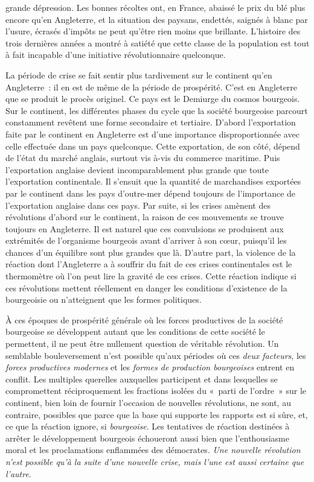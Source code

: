 \documentclass[twoside]{book} %
\begin{document}
grande dépression. Les bonnes récoltes ont, en France, abaissé le prix du blé plus encore qu’en Angleterre, et la situation des paysans, endettés, saignés à blanc par l’usure, écrasés d’impôts ne peut qu’être rien moins que brillante. L’histoire des trois dernières années a montré à satiété que cette classe de la population est tout à fait incapable d’une initiative révolutionnaire quelconque.\par
La période de crise se fait sentir plus tardivement sur le continent qu’en Angleterre : il en est de même de la période de prospérité. C’est en Angleterre que se produit le procès originel. Ce pays est le Demiurge du cosmos bourgeois. Sur le continent, les différentes phases du cycle que la société bourgeoise parcourt constamment revêtent une forme secondaire et tertiaire. D’abord l’exportation faite par le continent en Angleterre est d’une importance disproportionnée avec celle effectuée dans un pays quelconque. Cette exportation, de son côté, dépend de l’état du marché anglais, surtout vis à-vis du commerce maritime. Puis l’exportation anglaise devient incomparablement plus grande que toute l’exportation continentale. Il s’ensuit que la quantité de marchandises exportées par le continent dans les pays d’outre-mer dépend toujours de l’importance de l’exportation anglaise dans ces pays. Par suite, si les crises amènent des révolutions d’abord sur le continent, la raison de ces mouvements se trouve toujours en Angleterre. Il est naturel que ces convulsions se produisent aux extrémités de l’organisme bourgeois avant d’arriver à son cœur, puisqu’il les chances d’un équilibre sont plus grandes que là. D’autre part, la violence de la réaction dont l’Angleterre a à souffrir du fait de ces crises continentales est le thermomètre où l’on peut lire la gravité de ces crises. Cette réaction indique si ces révolutions mettent réellement en danger les conditions d’existence de la bourgeoisie ou n’atteignent que les formes politiques.\par
À ces époques de prospérité générale où les forces productives de la société bourgeoise se développent autant que les conditions de cette société le permettent, il ne peut être nullement question de véritable révolution. Un semblable bouleversement n’est possible qu’aux périodes où ces \emph{deux facteurs}, les \emph{forces productives modernes} et les \emph{formes de production bourgeoises} entrent en conflit. Les multiples querelles auxquelles participent et dans lesquelles se compromettent réciproquement les fractions isolées du « parti de l’ordre » sur le continent, bien loin de fournir l’occasion de nouvelles révolutions, ne sont, au contraire, possibles que parce que la base qui supporte les rapports est si sûre, et, ce que la réaction ignore, si \emph{bourgeoise}. Les tentatives de réaction destinées à arrêter le développement bourgeois échoueront aussi bien que l’enthousiasme moral et les proclamations enflammées des démocrates. \emph{Une nouvelle révolution n’est possible qu’à la suite d’une nouvelle crise, mais l’une est aussi certaine que l’autre}.\par
\end{document}
